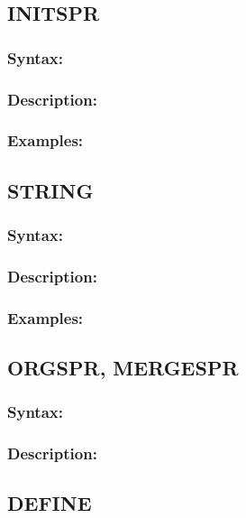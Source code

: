     \subsection{INITSPR}
        \subsubsection{Syntax:}

        \subsubsection{Description:}

        \subsubsection{Examples:}

    \subsection{STRING}
        \subsubsection{Syntax:}

        \subsubsection{Description:}

        \subsubsection{Examples:}


    \subsection{ORGSPR, MERGESPR}
        \subsubsection{Syntax:}

        \subsubsection{Description:}

    \subsection{DEFINE}
